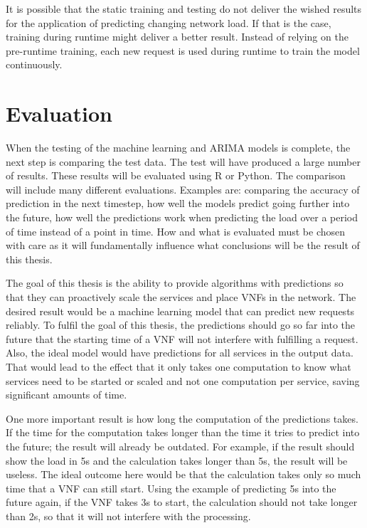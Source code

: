 \documentclass[12pt,a4paper]{scrartcl}
\begin{document}
	It is possible that the static training and testing do not deliver the wished results for the application of predicting changing network load.
	If that is the case, training during runtime might deliver a better result.
	Instead of relying on the pre-runtime training, each new request is used during runtime to train the model continuously.
	
	\section{Evaluation}
	When the testing of the machine learning and ARIMA models is complete, the next step is comparing the test data.
	The test will have produced a large number of results.
	These results will be evaluated using R or Python.
	The comparison will include many different evaluations.
	Examples are: comparing the accuracy of prediction in the next timestep, how well the models predict going further into the future, how well the predictions work when predicting the load over a period of time instead of a point in time. How and what is evaluated must be chosen with care as it will fundamentally influence what conclusions will be the result of this thesis.
	
	The goal of this thesis is the ability to provide algorithms with predictions so that they can proactively scale the services and place VNFs in the network.
	The desired result would be a machine learning model that can predict new requests reliably.
	To fulfil the goal of this thesis, the predictions should go so far into the future that the starting time of a VNF will not interfere with fulfilling a request.
	Also, the ideal model would have predictions for all services in the output data.
	That would lead to the effect that it only takes one computation to know what services need to be started or scaled and not one computation per service, saving significant amounts of time.
	
	One more important result is how long the computation of the predictions takes.
	If the time for the computation takes longer than the time it tries to predict into the future; the result will already be outdated.
	For example, if the result should show the load in 5s and the calculation takes longer than 5s, the result will be useless.
	The ideal outcome here would be that the calculation takes only so much time that a VNF can still start. Using the example of predicting 5s into the future again, if the VNF takes 3s to start, the calculation should not take longer than 2s, so that it will not interfere with the processing.
	
\end{document}

